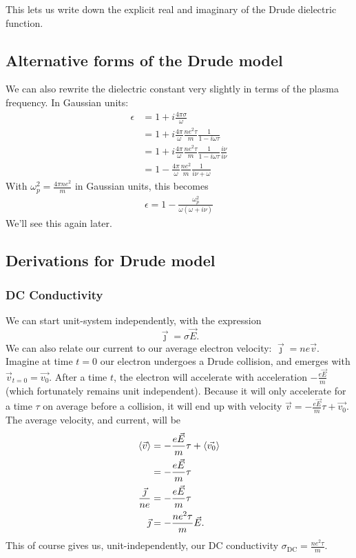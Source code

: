 \documentclass[../main.tex]{subfiles}
\newcommand{\sigmaDC}{\sigma_{\textrm{DC}}}
\begin{document}
	This lets us write down the explicit real and imaginary of the Drude dielectric function.

	\subsection{Alternative forms of the Drude model} \label{subsec:altforms}
	We can also rewrite the dielectric constant very slightly in terms of the plasma frequency.
	In Gaussian units:
	\begin{align}
		\epsilon &= 1 + i \frac{4 \pi \sigma}{\omega} \\
		&= 1 + i \frac{4 \pi}{\omega} \frac{n e^2 \tau}{m} \frac{1}{1 - i \omega \tau} \\
		&= 1 + i \frac{4 \pi}{\omega} \frac{n e^2 \tau}{m} \frac{1}{1 - i \omega \tau} \frac{i \nu}{i \nu} \\
		&= 1 - \frac{4 \pi}{\omega} \frac{n e^2 }{m} \frac{1}{i \nu + \omega }
	\end{align}
	With $\omega_p^2 = \frac{4 \pi n e^2}{m}$ in Gaussian units, this becomes
	\begin{align}
		\epsilon = 1 - \frac{\omega_p^2}{\omega ( \omega + i \nu )}
	\end{align}
	We'll see this again later.

	\subsection{Derivations for Drude model} \label{subsec:derivations}

	\subsubsection{DC Conductivity}
	We can start unit-system independently, with the expression
	\begin{equation}
	\vec{\jmath} = \sigma \vec{E}. \label{eq:DrudeTheory:ConductivityDef}
	\end{equation}
	We can also relate our current to our average electron velocity: $\vec{\jmath} = n e \vec{v}$.
	Imagine at time $t = 0$ our electron undergoes a Drude collision, and emerges with $\vec{v}_{t = 0} = \vec{v_0}$.
	After a time $t$, the electron will accelerate with acceleration $-\frac{e \vec{E}}{m}$ (which fortunately remains unit independent).
	Because it will only accelerate for a time $\tau$ on average before a collision, it will end up with velocity $\vec{v} = -\frac{e \vec{E}}{m}\tau + \vec{v_0}$.
	The average velocity, and current, will be
	\begin{align}
		\ev{\vec{v}} &= - \frac{e \vec{E}}{m}\tau + \ev{\vec{v_0}} \\
		&= - \frac{e \vec{E}}{m}\tau \\
		\frac{\vec{\jmath}}{ne} &= - \frac{e \vec{E}}{m}\tau \\
		\vec{\jmath} &= - \frac{n e^2 \tau}{m} \vec{E}.
	\end{align}
	This of course gives us, unit-independently, our DC conductivity $\sigmaDC = \frac{n e^2 \tau}{m}$.
\end{document}
